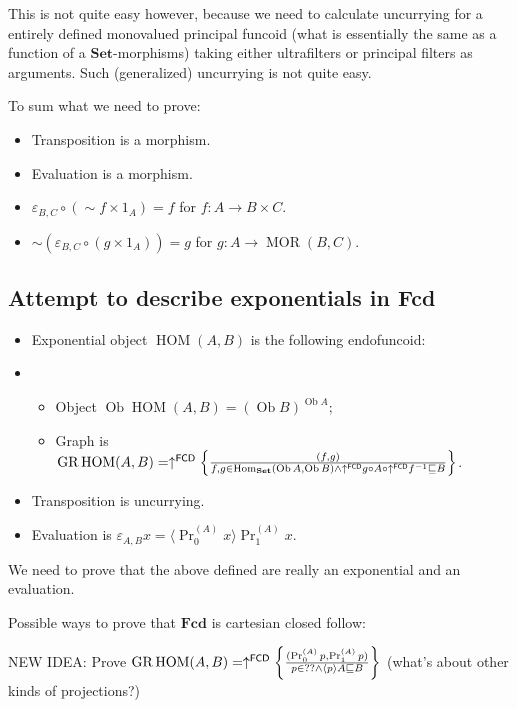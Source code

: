 This is not quite easy however, because we need to calculate uncurrying for a entirely defined monovalued principal funcoid (what is essentially the same as a function of a $\mathbf{Set}$-morphisms) taking either ultrafilters or principal filters as arguments. Such (generalized) uncurrying is not quite easy.

To sum what we need to prove:
\begin{itemize}
\item Transposition is a morphism.
\item Evaluation is a morphism.
\item $\varepsilon_{B,C} \circ ( \sim f \times 1_A) = f$ for $f : A \rightarrow B \times C$.
\item $\sim ( \varepsilon_{B,C} \circ ( g \times 1_A)) = g$ for $g : A \rightarrow \operatorname{MOR} ( B , C)$.
\end{itemize}

\subsection{Attempt to describe exponentials in Fcd}

\begin{itemize}
\item Exponential object $\operatorname{HOM}(A,B)$ is the following endofuncoid:
\item\begin{itemize}
\item Object $\operatorname{Ob}\operatorname{HOM}(A,B) = (\operatorname{Ob} B)^{\operatorname{Ob} A}$;
\item Graph is $\operatorname{GR} \operatorname{HOM} ( A , B) = \uparrow^{\mathsf{FCD}} \left\{ \frac{ ( f , g) }{ f, g \in \operatorname{Hom}_{\mathbf{Set}} (\operatorname{Ob} A,\operatorname{Ob} B) \wedge \uparrow^{\mathsf{FCD}}g \circ A \circ \uparrow^{\mathsf{FCD}}f^{- 1} \sqsubseteq B }\right\}$.
\end{itemize}
\item Transposition is uncurrying.
\item Evaluation is $\varepsilon_{A, B} x = \langle \operatorname{Pr}^{(A)}_0 x \rangle \operatorname{Pr}^{(A)}_1 x$.
\end{itemize}

We need to prove that the above defined are really an exponential and an evaluation.

Possible ways to prove that $\mathbf{Fcd}$ is cartesian closed follow:

NEW IDEA: Prove $\operatorname{GR}\operatorname{HOM}(A,B) =
\uparrow^{\mathsf{FCD}}\left\{ \frac{(\Pr^{(A)}_0 p,\Pr^{(A)}_1 p)}{
p\in??\land\left\langle p\right\rangle A\sqsubseteq B}\right\}$ (what's about other
kinds of projections?)

